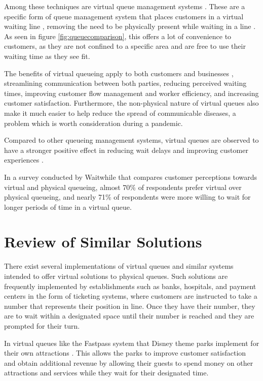 Among these techniques are virtual queue management systems \cite{mwangi2013reducing}. These are a specific form of queue management system that places customers in a virtual waiting line \cite{thamrin2020qmatic}, removing the need to be physically present while waiting in a line \cite{waitwhile2022survey}. As seen in figure \ref{fig:queuecomparison}, this offers a lot of convenience to customers, as they are not confined to a specific area and are free to use their waiting time as they see fit.

The benefits of virtual queueing apply to both customers and businesses \cite{thamrin2020qmatic}, streamlining communication between both parties, reducing perceived waiting times, improving customer flow management and worker efficiency, and increasing customer satisfaction. Furthermore, the non-physical nature of virtual queues also make it much easier to help reduce the spread of communicable diseases, a problem which is worth consideration during a pandemic.

Compared to other queueing management systems, virtual queues are observed to have a stronger positive effect in reducing wait delays and improving customer experiences \cite{mwangi2013reducing}.

In a survey conducted by Waitwhile \cite{waitwhile2022survey} that compares customer perceptions towards virtual and physical queueing, almost 70\% of respondents prefer virtual over physical queueing, and nearly 71\% of respondents were more willing to wait for longer periods of time in a virtual queue.

\section{Review of Similar Solutions}

There exist several implementations of virtual queues and similar systems intended to offer virtual solutions to physical queues. Such solutions are frequently implemented by establishments such as banks, hospitals, and payment centers in the form of ticketing systems, where customers are instructed to take a number that represents their position in line. Once they have their number, they are to wait within a designated space until their number is reached and they are prompted for their turn.

In virtual queues like the Fastpass system that Disney theme parks implement for their own attractions \cite{cope2011innovative}. This allows the parks to improve customer satisfaction and obtain additional revenue by allowing their guests to spend money on other attractions and services while they wait for their designated time.

